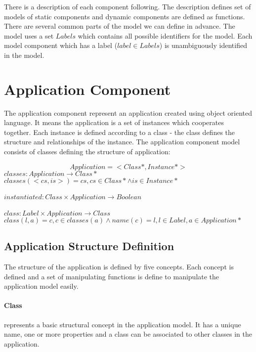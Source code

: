 \documentclass[11pt]{article}
\begin{document}
There is a description of each component following. The description defines set of models of static components and dynamic components are defined as functions. There are several common parts of the model we can define in advance. The model uses a set $Labels$ which contains all possible identifiers for the model. Each model component which has a label ($label \in Labels$) is unambiguously identified in the model.


\section{Application Component}
The application component represent an application created using object oriented language. It means the application is a set of instances which cooperates together. Each instance is defined according to a class - the class defines the structure and relationships of the instance. 
The application component model consists of  classes defining the structure of application:
 
$$
Application = <Class*, Instance*>
$$
$classes : Application \rightarrow Class*$ \\
$classes(<cs, is>) = cs, cs \in Class* \wedge is \in Instance* $ \\ \\
$instantiated : Class \times Application \rightarrow Boolean $ \\
\\
$class : Label \times Application \rightarrow Class  $ \\ 
$class(l, a) = c, c \in classes(a) \wedge name(c) = l, l \in Label, a \in Application* $ 

\subsection{Application Structure Definition}
The structure of the application is defined by five concepts. Each concept is defined and a set of manipulating functions is define to manipulate the application model easily.

\paragraph{Class} represents a basic structural concept in the application model. It has a unique name, one or more properties and a class can be associated to other classes in the application. 
	 
\end{document}
